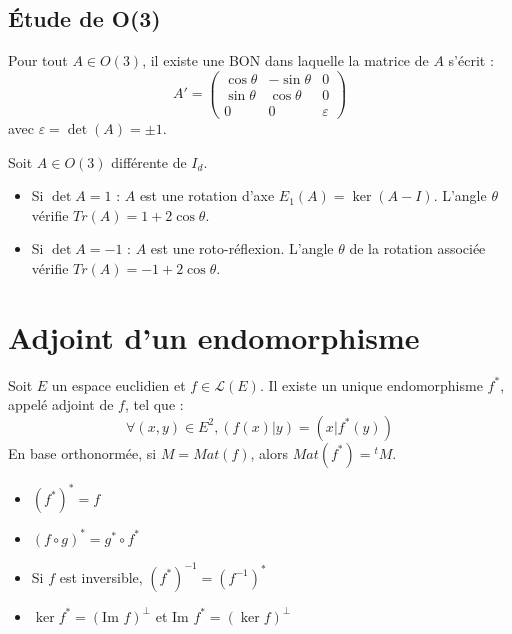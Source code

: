 \documentclass[french]{yLectureNote}
\begin{document}
\subsection{Étude de O(3)}

\begin{proposition}
    Pour tout $A \in O(3)$, il existe une BON dans laquelle la matrice de $A$ s'écrit :
    $$A' = \begin{pmatrix} \cos \theta & -\sin \theta & 0 \\ \sin \theta & \cos \theta & 0 \\ 0 & 0 & \varepsilon \end{pmatrix}$$
    avec $\varepsilon = \det(A) = \pm 1$.
\end{proposition}

\begin{proposition}
    Soit $A \in O(3)$ différente de $I_d$.
    \begin{itemize}
        \item Si $\det A = 1$ : $A$ est une rotation d'axe $E_1(A) = \ker(A - I)$. L'angle $\theta$ vérifie $Tr(A) = 1 + 2\cos \theta$.
        \item Si $\det A = -1$ : $A$ est une roto-réflexion. L'angle $\theta$ de la rotation associée vérifie $Tr(A) = -1 + 2\cos \theta$.
    \end{itemize}
\end{proposition}

\section{Adjoint d'un endomorphisme}

\begin{definition}[Adjoint]
    Soit $E$ un espace euclidien et $f \in \mathcal{L}(E)$. Il existe un unique endomorphisme $f^*$, appelé adjoint de $f$, tel que :
    $$\forall (x,y) \in E^2, (f(x)|y) = (x|f^*(y))$$
    En base orthonormée, si $M = Mat(f)$, alors $Mat(f^*) = {}^tM$.
\end{definition}

\begin{proposition}
    \begin{itemize}
        \item $(f^*)^* = f$
        \item $(f \circ g)^* = g^* \circ f^*$
        \item Si $f$ est inversible, $(f^*)^{-1} = (f^{-1})^*$
        \item $\ker f^* = (\text{Im } f)^\perp$ et $\text{Im } f^* = (\ker f)^\perp$
    \end{itemize}
\end{proposition}
\end{document}
